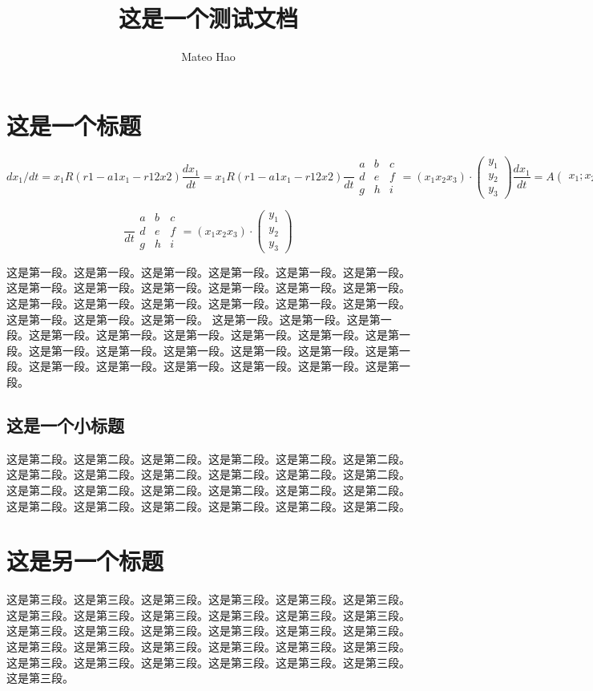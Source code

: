 \documentclass{article}
\title{这是一个测试文档}
\author{Mateo Hao}
\begin{document}
\maketitle{}


 \section{这是一个标题}


\[dx_{1}/dt=x_{1}R(r1-a1x_{1}-r12x2)\frac{dx_{1}}{dt}=x_{1}R(r1-a1x_{1}-r12x2)\frac{}{dt}\begin{matrix}a&b&c\\d&e&f\\g&h&i\end{matrix}=(x_{1}x_{2}x_{3})\cdot{}(\begin{matrix}y_{1}\\y_{2}\\y_{3}\end{matrix}){\frac{dx_{1}}{dt}=A(\begin{matrix}x_{1};x_{2}\end{matrix})\frac{dx_{2}}{dt}=A(\begin{matrix}x_{1};x_{2}\end{matrix}).}\]

\[\frac{}{dt}\begin{matrix}a&b&c\\d&e&f\\g&h&i\end{matrix}=(x_{1}x_{2}x_{3})\cdot{}(\begin{matrix}y_{1}\\y_{2}\\y_{3}\end{matrix})\]

这是第一段。这是第一段。这是第一段。这是第一段。这是第一段。这是第一段。这是第一段。这是第一段。这是第一段。这是第一段。这是第一段。这是第一段。这是第一段。这是第一段。这是第一段。这是第一段。这是第一段。这是第一段。这是第一段。这是第一段。这是第一段。 这是第一段。这是第一段。这是第一段。这是第一段。这是第一段。这是第一段。这是第一段。这是第一段。这是第一段。这是第一段。这是第一段。这是第一段。这是第一段。这是第一段。这是第一段。这是第一段。这是第一段。这是第一段。这是第一段。这是第一段。这是第一段。

\subsection{这是一个小标题}


这是第二段。这是第二段。这是第二段。这是第二段。这是第二段。这是第二段。这是第二段。这是第二段。这是第二段。这是第二段。这是第二段。这是第二段。这是第二段。这是第二段。这是第二段。这是第二段。这是第二段。这是第二段。这是第二段。这是第二段。这是第二段。这是第二段。这是第二段。这是第二段。

\section{这是另一个标题}


这是第三段。这是第三段。这是第三段。这是第三段。这是第三段。这是第三段。这是第三段。这是第三段。这是第三段。这是第三段。这是第三段。这是第三段。这是第三段。这是第三段。这是第三段。这是第三段。这是第三段。这是第三段。这是第三段。这是第三段。这是第三段。这是第三段。这是第三段。这是第三段。这是第三段。这是第三段。这是第三段。这是第三段。这是第三段。这是第三段。这是第三段。
\end{document}
